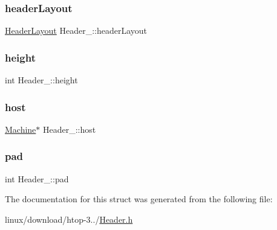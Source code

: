 \subsubsection{\texorpdfstring{header\+Layout}{headerLayout}}
{\footnotesize\ttfamily \hyperlink{HeaderLayout_8h_afc9cb7b84041249bac419260f679b6a9}{Header\+Layout} Header\+\_\+\+::header\+Layout}

\mbox{\label{structHeader___a379b3e4e65579fe01e4e075a02171b00}} 
\subsubsection{\texorpdfstring{height}{height}}
{\footnotesize\ttfamily int Header\+\_\+\+::height}

\mbox{\label{structHeader___aa1af1b14f9d80e73efef4da406a1835b}} 
\subsubsection{\texorpdfstring{host}{host}}
{\footnotesize\ttfamily \hyperlink{Machine_8h_aa3706f95e4706b9d02979efcabb1341d}{Machine}$\ast$ Header\+\_\+\+::host}

\mbox{\label{structHeader___a539a14a1eca2a97219ca15989b6d3a39}} 
\subsubsection{\texorpdfstring{pad}{pad}}
{\footnotesize\ttfamily int Header\+\_\+\+::pad}



The documentation for this struct was generated from the following file\+:\begin{DoxyCompactItemize}
\item 
linux/download/htop-\/3../\hyperlink{linux_2download_2htop-3_83_80_2Header_8h}{Header.\+h}\end{DoxyCompactItemize}
